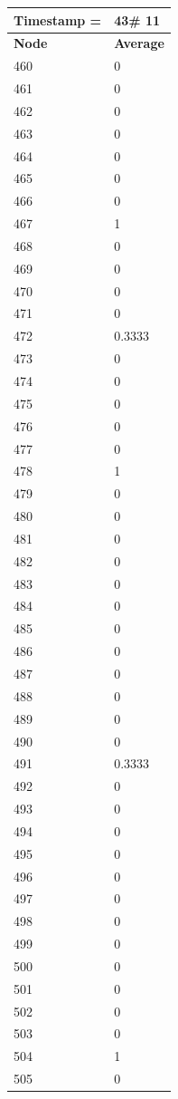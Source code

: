\begin{tabular}{|l||l|}
\hline
\textbf{Timestamp =} & \textbf{43}\# 11\\\hline
	\textbf{Node} & \textbf{Average} \\ \hline
\hline
	460 & 0 \\ \hline
	461 & 0 \\ \hline
	462 & 0 \\ \hline
	463 & 0 \\ \hline
	464 & 0 \\ \hline
	465 & 0 \\ \hline
	466 & 0 \\ \hline
	467 & 1 \\ \hline
	468 & 0 \\ \hline
	469 & 0 \\ \hline
	470 & 0 \\ \hline
	471 & 0 \\ \hline
	472 & 0.3333 \\ \hline
	473 & 0 \\ \hline
	474 & 0 \\ \hline
	475 & 0 \\ \hline
	476 & 0 \\ \hline
	477 & 0 \\ \hline
	478 & 1 \\ \hline
	479 & 0 \\ \hline
	480 & 0 \\ \hline
	481 & 0 \\ \hline
	482 & 0 \\ \hline
	483 & 0 \\ \hline
	484 & 0 \\ \hline
	485 & 0 \\ \hline
	486 & 0 \\ \hline
	487 & 0 \\ \hline
	488 & 0 \\ \hline
	489 & 0 \\ \hline
	490 & 0 \\ \hline
	491 & 0.3333 \\ \hline
	492 & 0 \\ \hline
	493 & 0 \\ \hline
	494 & 0 \\ \hline
	495 & 0 \\ \hline
	496 & 0 \\ \hline
	497 & 0 \\ \hline
	498 & 0 \\ \hline
	499 & 0 \\ \hline
	500 & 0 \\ \hline
	501 & 0 \\ \hline
	502 & 0 \\ \hline
	503 & 0 \\ \hline
	504 & 1 \\ \hline
	505 & 0 \\ \hline
\end{tabular}

